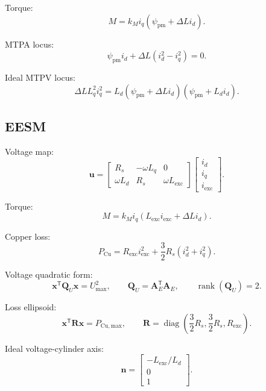\documentclass[11pt,a4paper]{article}
\newcommand{\id}{i_d}
\newcommand{\iq}{i_q}
\newcommand{\ie}{i_{\mathrm{exc}}}
\newcommand{\Rs}{R_s}
\newcommand{\Rexc}{R_{\mathrm{exc}}}
\newcommand{\Ld}{L_d}
\newcommand{\Lq}{L_q}
\newcommand{\Lexc}{L_{\mathrm{exc}}}
\newcommand{\psipm}{\psi_{\mathrm{pm}}}
\newcommand{\w}{\omega}
\newcommand{\Umax}{U_{\max}}
\newcommand{\Pmax}{P_{\mathrm{Cu,max}}}
\newcommand{\T}{\mathsf{T}}
\newcommand{\vct}[1]{\bm{#1}}
\newcommand{\mat}[1]{\bm{#1}}
\begin{document}
Torque:
\begin{equation}
  M=k_M\iq(\psipm+\Delta L\id).
\end{equation}

MTPA locus:
\begin{equation}
  \psipm\id+\Delta L(\id^2-\iq^2)=0.
\end{equation}

Ideal MTPV locus:
\begin{equation}
  \Delta L\Lq^2\iq^2
  =\Ld(\psipm+\Delta L\id)(\psipm+\Ld\id).
\end{equation}

\subsection*{EESM}

Voltage map:
\begin{equation}
\vct u=
\begin{bmatrix}
\Rs&-\w\Lq&0\\
\w\Ld&\Rs&\w\Lexc
\end{bmatrix}
\begin{bmatrix}\id\\\iq\\\ie\end{bmatrix}.
\end{equation}

Torque:
\begin{equation}
  M=k_M\iq(\Lexc\ie+\Delta L\id).
\end{equation}

Copper loss:
\begin{equation}
  P_{\mathrm{Cu}}
  =\Rexc\ie^2+\frac32\Rs(\id^2+\iq^2).
\end{equation}

Voltage quadratic form:
\begin{equation}
  \vct x^\T\mat Q_U\vct x=\Umax^2,
  \qquad
  \mat Q_U=\mat A_E^\T\mat A_E,
  \qquad
  \operatorname{rank}(\mat Q_U)=2.
\end{equation}

Loss ellipsoid:
\begin{equation}
  \vct x^\T\mat R\vct x=\Pmax,
  \qquad
  \mat R=\operatorname{diag}\left(\frac32\Rs,\frac32\Rs,\Rexc\right).
\end{equation}

Ideal voltage-cylinder axis:
\begin{equation}
  \vct n=
  \begin{bmatrix}-\Lexc/\Ld\\0\\1\end{bmatrix}.
\end{equation}
\end{document}
